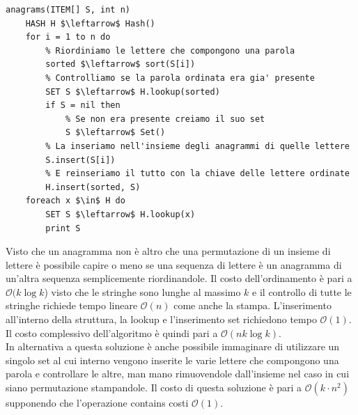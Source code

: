 \documentclass[../cheatSheetAlgoritmi.tex]{subfiles}
\begin{document}
\begin{lstlisting}[caption=anagrammi]
anagrams(ITEM[] S, int n)
	HASH H $\leftarrow$ Hash()
	for i = 1 to n do
		% Riordiniamo le lettere che compongono una parola
		sorted $\leftarrow$ sort(S[i])
		% Controlliamo se la parola ordinata era gia' presente
		SET S $\leftarrow$ H.lookup(sorted)
		if S = nil then
			% Se non era presente creiamo il suo set
			S $\leftarrow$ Set()
		% La inseriamo nell'insieme degli anagrammi di quelle lettere
		S.insert(S[i])
		% E reinseriamo il tutto con la chiave delle lettere ordinate
		H.insert(sorted, S)
	foreach x $\in$ H do
		SET S $\leftarrow$ H.lookup(x)
		print S
\end{lstlisting}
Visto che un anagramma non è altro che una permutazione di un insieme di lettere è possibile capire o meno se una sequenza di lettere è un anagramma di un'altra sequenza semplicemente riordinandole. Il costo dell'ordinamento è pari a $\mathcal{O}(k \log{k}$) visto che le stringhe sono lunghe al massimo $k$ e il controllo di tutte le stringhe richiede tempo lineare $\mathcal{O}(n)$ come anche la stampa. L'inserimento all'interno della struttura, la lookup e l'inserimento set richiedono tempo $\mathcal{O}(1)$.\\
Il costo complessivo dell'algoritmo è quindi pari a $\mathcal{O}(nk \log{k})$.\\
In alternativa a questa soluzione è anche possibile immaginare di utilizzare un singolo set al cui interno vengono inserite le varie lettere che compongono una parola e controllare le altre, man mano rimuovendole dall'insieme nel caso in cui siano permutazione stampandole. Il costo di questa soluzione è pari a $\mathcal{O}(k \cdot n^{2})$ supponendo che l'operazione contains costi $\mathcal{O}(1)$.
\newpage
\end{document}
